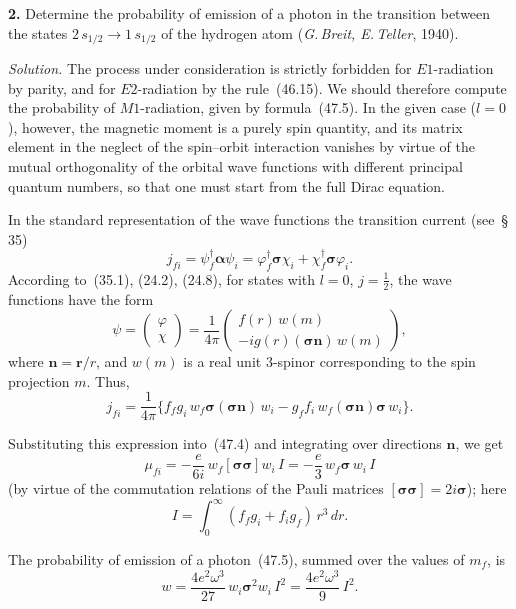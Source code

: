\textbf{2.} Determine the probability of emission of a photon in the transition between the states $2\,s_{1/2} \to 1\,s_{1/2}$ of the hydrogen atom (\textit{G.\,Breit, E.\,Teller}, 1940).

\textit{Solution.} The process under consideration is strictly forbidden for $E1$-radiation by parity, and for $E2$-radiation by the rule~(46.15). We should therefore compute the probability of $M1$-radiation, given by formula~(47.5). In the given case ($l = 0$), however, the magnetic moment is a purely spin quantity, and its matrix element in the neglect of the spin--orbit interaction vanishes by virtue of the mutual orthogonality of the orbital wave functions with different principal quantum numbers, so that one must start from the full Dirac equation.

In the standard representation of the wave functions the transition current (see~\S\,35)
\[
j_{fi} = \psi^\dagger_f\boldsymbol{\alpha}\psi_i = \varphi^\dagger_f\boldsymbol{\sigma}\chi_i + \chi^\dagger_f\boldsymbol{\sigma}\varphi_i.
\]
According to~(35.1), (24.2), (24.8), for states with $l = 0$, $j = \tfrac{1}{2}$, the wave functions have the form
\[
\psi = \begin{pmatrix}\varphi\\\chi\end{pmatrix} = \frac{1}{4\pi}\begin{pmatrix}f(r)\,w(m)\\-ig(r)(\boldsymbol{\sigma}\mathbf{n})\,w(m)\end{pmatrix},
\]
where $\mathbf{n} = \mathbf{r}/r$, and $w(m)$ is a real unit 3-spinor corresponding to the spin projection $m$. Thus,
\[
j_{fi} = \frac{1}{4\pi}\bigl\{f_f g_i\,w_f\boldsymbol{\sigma}(\boldsymbol{\sigma}\mathbf{n})\,w_i - g_f f_i\,w_f(\boldsymbol{\sigma}\mathbf{n})\boldsymbol{\sigma}\,w_i\bigr\}.
\]

Substituting this expression into~(47.4) and integrating over directions $\mathbf{n}$, we get
\[
\mu_{fi} = -\frac{e}{6i}\,w_f[\boldsymbol{\sigma}\boldsymbol{\sigma}]w_i\,I = -\frac{e}{3}\,w_f\boldsymbol{\sigma}\,w_i\,I
\]
(by virtue of the commutation relations of the Pauli matrices $[\boldsymbol{\sigma}\boldsymbol{\sigma}] = 2i\boldsymbol{\sigma}$); here
\begin{equation}
I = \int_0^\infty (f_f g_i + f_i g_f)\,r^3\,dr.
\tag*{(1)}
\end{equation}

The probability of emission of a photon~(47.5), summed over the values of $m_f$, is
\begin{equation}
w = \frac{4e^2\omega^3}{27}\,w_i\boldsymbol{\sigma}^2 w_i\,I^2 = \frac{4e^2\omega^3}{9}\,I^2.
\tag*{(2)}
\end{equation}

